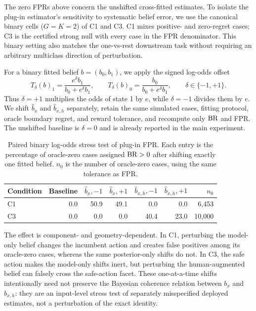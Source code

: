 The zero FPRs above concern the unshifted cross-fitted estimates.  To isolate the plug-in estimator's sensitivity to systematic belief error, we use the canonical binary cells ($G=K=2$) of C1 and C3.  C1 mixes positive- and zero-regret cases; C3 is the certified strong null with every case in the FPR denominator.  This binary setting also matches the one-vs-rest downstream task without requiring an arbitrary multiclass direction of perturbation.

For a binary fitted belief $b=(b_0,b_1)$, we apply the signed log-odds offset
\[
T_\delta(b)_1 = \frac{e^\delta b_1}{b_0 + e^\delta b_1},
\qquad
T_\delta(b)_0 = \frac{b_0}{b_0 + e^\delta b_1},
\qquad \delta\in\{-1,+1\}.
\]
Thus $\delta=+1$ multiplies the odds of state 1 by $e$, while $\delta=-1$ divides them by $e$.  We shift $\hat b_x$ and $\hat b_{x,h}$ separately, retain the same simulated cases, fitting protocol, oracle boundary regret, and reward tolerance, and recompute only $\operatorname{BR}$ and FPR.  The unshifted baseline is $\delta=0$ and is already reported in the main experiment.

\begin{table}[htbp]
\centering
\caption{Paired binary log-odds stress test of plug-in FPR. Each entry is the percentage of oracle-zero cases assigned $\operatorname{BR}>0$ after shifting exactly one fitted belief. $n_0$ is the number of oracle-zero cases, using the same tolerance as FPR.}
\label{tab:exp1-miscalibration}
\small
\begin{tabular}{@{}lrrrrrr@{}}
\toprule
Condition & Baseline & $\hat b_x,-1$ & $\hat b_x,+1$ & $\hat b_{x,h},-1$ & $\hat b_{x,h},+1$ & $n_0$ \\
\midrule
C1 & 0.0 & 50.9 & 49.1 & 0.0 & 0.0 & 6,453 \\
C3 & 0.0 & 0.0 & 0.0 & 40.4 & 23.0 & 10,000 \\
\bottomrule
\end{tabular}
\end{table}

The effect is component- and geometry-dependent.  In C1, perturbing the model-only belief changes the incumbent action and creates false positives among its oracle-zero cases, whereas the same posterior-only shifts do not.  In C3, the safe action makes the model-only shifts inert, but perturbing the human-augmented belief can falsely cross the safe-action facet.  These one-at-a-time shifts intentionally need not preserve the Bayesian coherence relation between $b_x$ and $b_{x,h}$: they are an input-level stress test of separately misspecified deployed estimates, not a perturbation of the exact identity.


